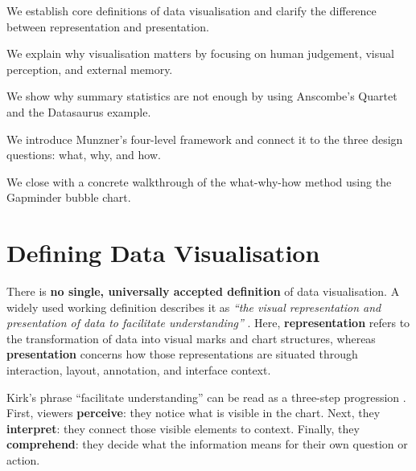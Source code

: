 
\begin{topicsummary}
    \item We establish core definitions of data visualisation and clarify the difference between representation and presentation.
    \item We explain why visualisation matters by focusing on human judgement, visual perception, and external memory.
    \item We show why summary statistics are not enough by using Anscombe's Quartet and the Datasaurus example.
    \item We introduce Munzner's four-level framework and connect it to the three design questions: what, why, and how.
    \item We close with a concrete walkthrough of the what-why-how method using the Gapminder bubble chart.
\end{topicsummary}

\section{Defining Data Visualisation}

There is \textbf{no single, universally accepted definition} of data visualisation. A widely used working definition describes it as \textit{``the visual representation and presentation of data to facilitate understanding''} \parencite{kirk2019}. Here, \textbf{representation} refers to the transformation of data into visual marks and chart structures, whereas \textbf{presentation} concerns how those representations are situated through interaction, layout, annotation, and interface context.


Kirk's phrase ``facilitate understanding'' can be read as a three-step progression \parencite[p.~29]{kirk2019}. First, viewers \textbf{perceive}: they notice what is visible in the chart. Next, they \textbf{interpret}: they connect those visible elements to context. Finally, they \textbf{comprehend}: they decide what the information means for their own question or action.

